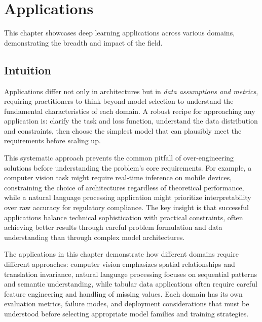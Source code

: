 
\chapter{Applications}
\label{chap:applications}

This chapter showcases deep learning applications across various domains, demonstrating the breadth and impact of the field.


\begin{learningobjectives}
\end{learningobjectives}



\section*{Intuition}

Applications differ not only in architectures but in \emph{data assumptions and metrics}, requiring practitioners to think beyond model selection to understand the fundamental characteristics of each domain. A robust recipe for approaching any application is: clarify the task and loss function, understand the data distribution and constraints, then choose the simplest model that can plausibly meet the requirements before scaling up.

This systematic approach prevents the common pitfall of over-engineering solutions before understanding the problem's core requirements. For example, a computer vision task might require real-time inference on mobile devices, constraining the choice of architectures regardless of theoretical performance, while a natural language processing application might prioritize interpretability over raw accuracy for regulatory compliance. The key insight is that successful applications balance technical sophistication with practical constraints, often achieving better results through careful problem formulation and data understanding than through complex model architectures.

The applications in this chapter demonstrate how different domains require different approaches: computer vision emphasizes spatial relationships and translation invariance, natural language processing focuses on sequential patterns and semantic understanding, while tabular data applications often require careful feature engineering and handling of missing values. Each domain has its own evaluation metrics, failure modes, and deployment considerations that must be understood before selecting appropriate model families and training strategies.

